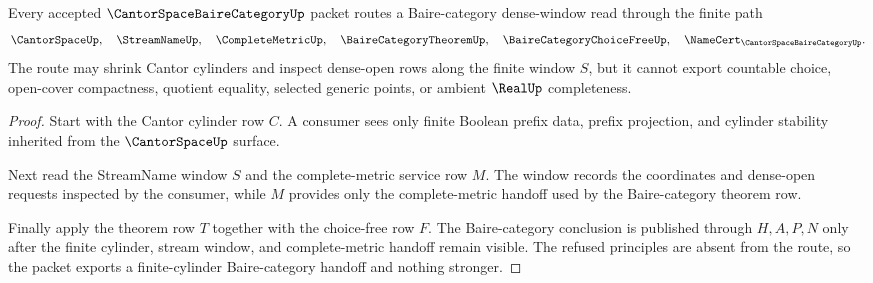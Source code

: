 \begin{theorem}
\label{thm:cantor-space-baire-category-cylinder-route}
Every accepted $\CantorSpaceBaireCategoryUp$ packet routes a Baire-category dense-window read through the finite path
$$
\CantorSpaceUp,\quad
\StreamNameUp,\quad
\CompleteMetricUp,\quad
\BaireCategoryTheoremUp,\quad
\BaireCategoryChoiceFreeUp,\quad
\NameCert_{\CantorSpaceBaireCategoryUp}.
$$
The route may shrink Cantor cylinders and inspect dense-open rows along the finite window $S$, but it cannot export countable choice, open-cover compactness, quotient equality, selected generic points, or ambient $\RealUp$ completeness.
\end{theorem}
\begin{proof}
Start with the Cantor cylinder row $C$. A consumer sees only finite Boolean prefix data, prefix projection, and cylinder stability inherited from the $\CantorSpaceUp$ surface.

Next read the StreamName window $S$ and the complete-metric service row $M$. The window records the coordinates and dense-open requests inspected by the consumer, while $M$ provides only the complete-metric handoff used by the Baire-category theorem row.

Finally apply the theorem row $T$ together with the choice-free row $F$. The Baire-category conclusion is published through $H,A,P,N$ only after the finite cylinder, stream window, and complete-metric handoff remain visible. The refused principles are absent from the route, so the packet exports a finite-cylinder Baire-category handoff and nothing stronger.
\end{proof}



